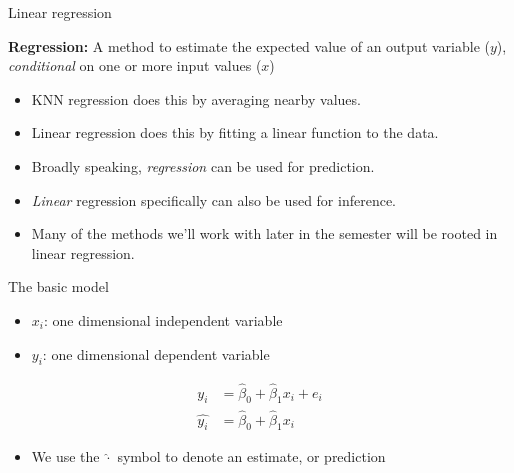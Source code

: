 \documentclass[aspectratio=169]{beamer}
\begin{document}
\begin{frame}{Linear regression}

\textbf{Regression:} A method to estimate the expected value of an output variable ($y$), \textit{conditional} on one or more input values ($x$)

\begin{itemize}
\item KNN regression does this by averaging nearby values.

\item Linear regression does this by fitting a linear function to the data.

\item Broadly speaking, \textit{regression} can be used for prediction.

\item \textit{Linear} regression specifically can also be used for inference.

\item Many of the methods we'll work with later in the semester will be rooted in linear regression.
\end{itemize}

\end{frame}

\begin{frame}{The basic model}

\begin{itemize}
\item $x_i$: one dimensional independent variable 
\item $y_i$: one dimensional dependent variable
\end{itemize}

\begin{align*}
y_i &= \hat{\beta}_0 + \hat{\beta}_1 x_i + e_i\\
\hat{y_i} &= \hat{\beta}_0 + \hat{\beta}_1 x_i
\end{align*}

\begin{itemize}
\item We use the $\hat{\cdot}$ symbol to denote an estimate, or prediction
\end{itemize}
\end{frame}
\end{document}
